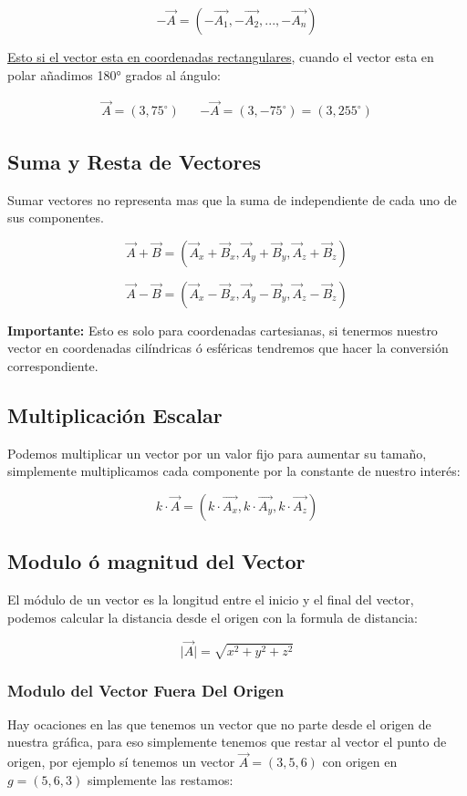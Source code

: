 \documentclass{article}
\begin{document}
\[
-\vec{A} = (-\vec{A_1},-\vec{A_2},...,-\vec{A_n})
\]

\uline{Esto si el vector esta en coordenadas rectangulares}, cuando el vector esta en polar añadimos 180° grados al ángulo: 

\[ \begin{aligned}
\vec{A} = (3,75^\circ) && -\vec{A} = (3,-75^\circ) = (3,255^\circ)
\end{aligned} \]

\subsection{Suma y Resta de Vectores}
\label{sec:orgbdff8d4}
Sumar vectores no representa mas que la suma de independiente de cada uno de sus componentes.

\[
\vec{A} + \vec{B} = (\vec{A}_x + \vec{B}_x,\vec{A}_y + \vec{B}_y,\vec{A}_z + \vec{B}_z)
\]

\[
\vec{A} - \vec{B} = (\vec{A}_x - \vec{B}_x,\vec{A}_y - \vec{B}_y,\vec{A}_z - \vec{B}_z)
\]

\textbf{Importante:} Esto es solo para coordenadas cartesianas, si tenermos nuestro vector en coordenadas cilíndricas ó esféricas tendremos que hacer la conversión correspondiente.

\subsection{Multiplicación Escalar}
\label{sec:org9ce401b}
Podemos multiplicar un vector por un valor fijo para aumentar su tamaño, simplemente multiplicamos cada componente por la constante de nuestro interés:

\[
k \cdot \vec{A} = (k\cdot\vec{A_x},k\cdot\vec{A_y},k\cdot\vec{A_z})
\]

\subsection{Modulo ó magnitud del Vector}
\label{sec:org0ded831}
El módulo de un vector es la longitud entre el inicio y el final del vector, podemos calcular la distancia desde el origen con la formula de distancia:

\[
\vert\vec{A}\vert = \sqrt{ x^2 + y^2 + z^2 }
\]

\subsubsection*{Modulo del Vector Fuera Del Origen}
\label{sec:org9f8ac1a}
Hay ocaciones en las que tenemos un vector que no parte desde el origen de nuestra gráfica, para eso simplemente tenemos que restar al vector el punto de origen, por ejemplo sí tenemos un vector \(\vec{A} = (3,5,6)\) con origen en \(g = (5,6,3)\) simplemente las restamos:
\end{document}
